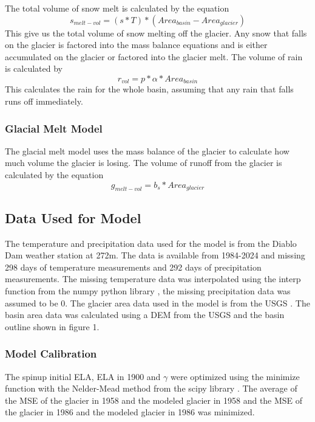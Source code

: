 \documentclass{article}
\begin{document}
The total volume of snow melt is calculated by the equation
\begin{equation}s_{melt-vol}=(s*T)*({Area}_{basin}-{Area}_{glacier})\end{equation}
This give us the total volume of snow melting off the glacier. Any snow that falls on the glacier is factored into the mass balance equations 
and is either accumulated on the glacier or factored into the glacier melt.
The volume of rain is calculated by
\begin{equation}r_{vol}=p*\alpha*{Area}_{basin}\end{equation}
This calculates the rain for the whole basin, assuming that any rain that falls runs off immediately.

\subsubsection{Glacial Melt Model}
The glacial melt model uses the mass balance of the glacier to calculate how much volume the glacier is losing. The volume of runoff from the 
glacier is calculated by the equation
\begin{equation}g_{melt-vol}=b_s*{Area}_{glacier}\end{equation}
\subsection{Data Used for Model}
The temperature and precipitation data used for the model is from the Diablo Dam weather station at 272m. The data is available from 1984-2024 
and missing 298 days of temperature measurements and 292 days of precipitation measurements. The missing temperature data was interpolated 
using the interp function from the numpy python library \cite{ref7}, the missing precipitation data was assumed to be 0. The glacier area data used in 
the model is from the USGS \cite{ref8}. The basin area data was calculated using a DEM from the USGS and the basin outline shown in figure 1.

\subsubsection{Model Calibration}
The spinup initial ELA, ELA in 1900 and $\gamma$ were optimized using the minimize function with the Nelder-Mead method from the scipy library \cite{ref9}.
The average of the MSE of the glacier in 1958 and the modeled glacier in 1958 and the MSE of the glacier in 1986 and the modeled glacier in 1986 was minimized.
\end{document}
